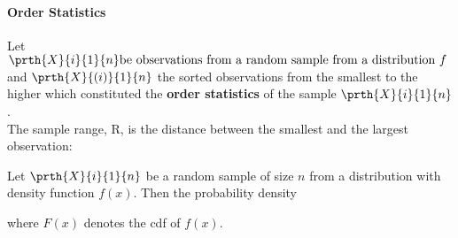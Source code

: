 \paragraph{Order Statistics}
Let $\prth{X}{i}{1}{n}\text{be observations from a random sample from a
distribution }f$ and $\prth{X}{(i)}{1}{n}$ the sorted observations from
the smallest to the higher which constituted the \textbf{order 
statistics} of the sample $\prth{X}{i}{1}{n}$.\\
The sample range, R, is the distance between the smallest and the largest
observation:
\begin{center}
\end{center}
Let $\prth{X}{i}{1}{n}$ be a random sample of size $n$ from a
distribution with density function $f(x)$. Then the probability density
\begin{center}
\end{center}
where $F(x)$ denotes the cdf of $f(x)$.

